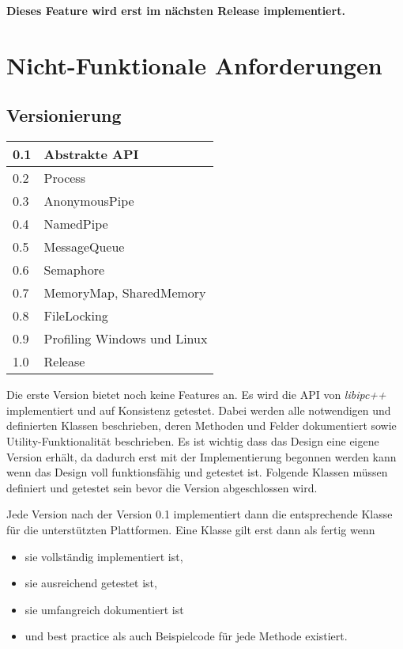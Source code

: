 \documentclass[a4paper]{book}
\begin{document}
\noindent \textbf{Dieses Feature wird erst im nächsten Release implementiert.}

\section{Nicht-Funktionale Anforderungen}
\subsection{Versionierung}
\begin{center}
\begin{longtable}{|p{3cm}|p{8cm}|}
\hline
0.1 & Abstrakte API \\
\hline
0.2 & Process \\
\hline
0.3 & AnonymousPipe \\
\hline
0.4 & NamedPipe \\
\hline 
0.5 & MessageQueue \\
\hline
0.6 & Semaphore \\
\hline
0.7 & MemoryMap, SharedMemory \\ 
\hline
0.8 & FileLocking \\
\hline
0.9 & Profiling Windows und Linux\\
\hline
1.0 & Release \\
\hline
\end{longtable}
\end{center}
Die erste Version bietet noch keine Features an. Es wird die API von \textit{libipc++} implementiert und auf Konsistenz getestet. Dabei werden alle notwendigen und definierten Klassen beschrieben, deren Methoden und Felder dokumentiert sowie Utility-Funktionalität beschrieben. Es ist wichtig dass das Design eine eigene Version erhält, da dadurch erst mit der Implementierung begonnen werden kann wenn das Design voll funktionsfähig und getestet ist. Folgende Klassen müssen definiert und getestet sein bevor die Version abgeschlossen wird.\newline

\noindent Jede Version nach der Version 0.1 implementiert dann die entsprechende Klasse für die unterstützten Plattformen. Eine Klasse gilt erst dann als fertig wenn
\begin{itemize}
\item sie vollständig implementiert ist,
\item sie ausreichend getestet ist,
\item sie umfangreich dokumentiert ist
\item und best practice als auch Beispielcode für jede Methode existiert.
\end{itemize}
\end{document}
